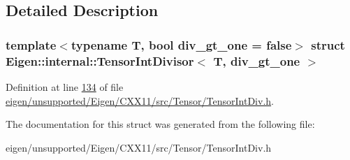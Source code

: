 \subsection{Detailed Description}
\subsubsection*{template$<$typename T, bool div\+\_\+gt\+\_\+one = false$>$\newline
struct Eigen\+::internal\+::\+Tensor\+Int\+Divisor$<$ T, div\+\_\+gt\+\_\+one $>$}



Definition at line \hyperlink{eigen_2unsupported_2_eigen_2_c_x_x11_2src_2_tensor_2_tensor_int_div_8h_source_l00134}{134} of file \hyperlink{eigen_2unsupported_2_eigen_2_c_x_x11_2src_2_tensor_2_tensor_int_div_8h_source}{eigen/unsupported/\+Eigen/\+C\+X\+X11/src/\+Tensor/\+Tensor\+Int\+Div.\+h}.



The documentation for this struct was generated from the following file\+:\begin{DoxyCompactItemize}
\item 
eigen/unsupported/\+Eigen/\+C\+X\+X11/src/\+Tensor/\+Tensor\+Int\+Div.\+h\end{DoxyCompactItemize}
